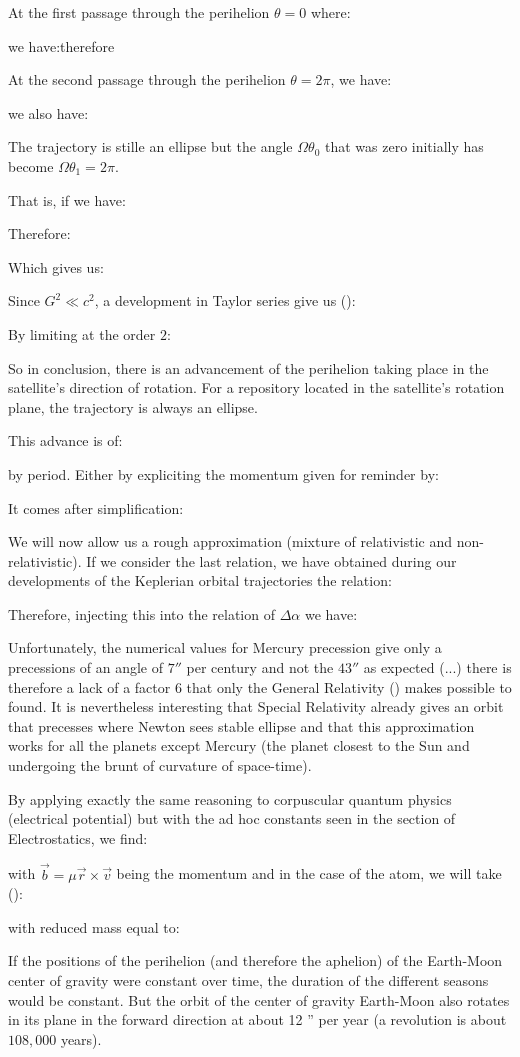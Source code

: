 	At the first passage through the perihelion $\theta=0$ where:
	
	we have:therefore
	
	At the second passage through the perihelion $\theta=2\pi$, we have:
	
	we also have:
	
	The trajectory is stille an ellipse but the angle $\Omega\theta_0$ that was zero initially has become $\Omega\theta_1=2\pi$.

	That is, if we have:
	
	Therefore:
	
	Which gives us:
	
	Since $G^2\ll c^2$, a development in Taylor series give us ():
	
	By limiting at the order $2$:
	
	So in conclusion, there is an advancement of the perihelion taking place in the satellite's direction of rotation. For a repository located in the satellite's rotation plane, the trajectory is always an ellipse.

	This advance is of:
	
	by period. Either by expliciting the momentum given for reminder by:
	
	It comes after simplification:
	
	We will now allow us a rough approximation (mixture of relativistic and non-relativistic). If we consider the last relation, we have obtained during our developments of the Keplerian orbital trajectories the relation:
	
	Therefore, injecting this into the relation of $\Delta \alpha$	we have:
	
	Unfortunately, the numerical values for Mercury precession give only a precessions of an angle of $7''$ per century and not the $43''$ as expected (...) there is therefore a lack of a factor $6$ that only the General 
Relativity () makes possible to found. It is nevertheless interesting that Special Relativity already gives an orbit that precesses where Newton sees stable ellipse and that this approximation works for all the planets except Mercury (the planet closest to the Sun and undergoing the brunt of curvature of space-time).
	\begin{tcolorbox}[title=Remark,colframe=black,arc=10pt]
	By applying exactly the same reasoning to corpuscular quantum physics (electrical potential) but with the ad hoc constants seen in the section of Electrostatics, we find:
	
	with $\vec{b}=\mu\vec{r}\times\vec{v}$ being the momentum and in the case of the atom, we will take ():
	
	with reduced mass equal to:
	
	\end{tcolorbox}
	If the positions of the perihelion (and therefore the aphelion) of the Earth-Moon center of gravity  were constant over time, the duration of the different seasons would be constant. But the orbit of the center of gravity Earth-Moon also rotates in its plane in the forward direction at about 12 '' per year (a revolution is about $108,000$ years).

